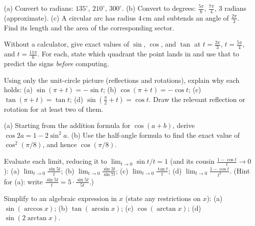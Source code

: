 \begin{exercise}
(a) Convert to radians: $135^\circ$, $210^\circ$, $300^\circ$.
(b) Convert to degrees: $\tfrac{5\pi}{6}$, $\tfrac{7\pi}{4}$, $3$ radians (approximate).
(c) A circular arc has radius $4\,\text{cm}$ and subtends an angle of $\tfrac{2\pi}{3}$. Find its length and the area of the corresponding sector.
\end{exercise}

\begin{exercise}
Without a calculator, give exact values of $\sin$, $\cos$, and $\tan$ at $t = \tfrac{2\pi}{3}$, $t = \tfrac{5\pi}{4}$, and $t = \tfrac{11\pi}{6}$. For each, state which quadrant the point lands in and use that to predict the signs \emph{before} computing.
\end{exercise}

\begin{exercise}
Using only the unit-circle picture (reflections and rotations), explain why each holds:
(a) $\sin(\pi + t) = -\sin t$;\quad
(b) $\cos(\pi + t) = -\cos t$;\quad
(c) $\tan(\pi + t) = \tan t$;\quad
(d) $\sin(\tfrac{\pi}{2} + t) = \cos t$. Draw the relevant reflection or rotation for at least two of them.
\end{exercise}

\begin{exercise}
(a) Starting from the addition formula for $\cos(a+b)$, derive $\cos 2a = 1 - 2\sin^2 a$.
(b) Use the half-angle formula to find the exact value of $\cos^2(\pi/8)$, and hence $\cos(\pi/8)$.
\end{exercise}

\begin{exercise}
Evaluate each limit, reducing it to $\lim_{t\to0}\sin t/t = 1$ (and its cousin $\tfrac{1-\cos t}{t}\to 0$):
(a) $\displaystyle\lim_{t\to 0}\frac{\sin 5t}{t}$;\quad
(b) $\displaystyle\lim_{t\to 0}\frac{\sin 3t}{\sin 7t}$;\quad
(c) $\displaystyle\lim_{t\to 0}\frac{\tan t}{t}$;\quad
(d) $\displaystyle\lim_{t\to 0}\frac{1 - \cos t}{t^2}$.
(Hint for (a): write $\tfrac{\sin 5t}{t} = 5\cdot\tfrac{\sin 5t}{5t}$.)
\end{exercise}

\begin{exercise}
Simplify to an algebraic expression in $x$ (state any restrictions on $x$):
(a) $\sin(\arccos x)$;\quad
(b) $\tan(\arcsin x)$;\quad
(c) $\cos(\arctan x)$;\quad
(d) $\sin(2\arctan x)$.
\end{exercise}

